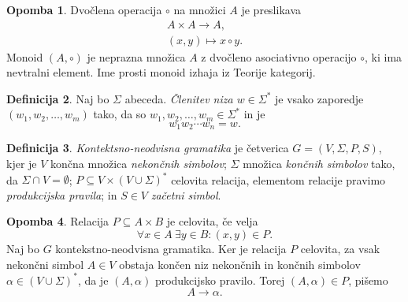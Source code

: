 \documentclass{amsart}
\theoremstyle{definition}
\newtheorem{definicija}{Definicija}[section]
\newtheorem{opomba}[definicija]{Opomba}
\theoremstyle{plain} %
\begin{document}
\begin{opomba}
    
    Dvočlena operacija $ \circ $ na množici $ A $ je preslikava
    \begin{gather*}
        A \times A \rightarrow A, \\
        (x,y) \mapsto x \circ y.
    \end{gather*}
    Monoid $ (A, \circ) $ je neprazna množica $ A $ z dvočleno asociativno operacijo $ \circ $,
    ki ima nevtralni element. Ime prosti monoid izhaja iz Teorije kategorij.

\end{opomba}

\begin{definicija}

    Naj bo $ \Sigma $ abeceda. \textit{Členitev niza $ w \in \Sigma^*$} je vsako zaporedje $ (w_1, w_2, \ldots, w_m ) $ tako,
    da so $ w_1, w_2, \ldots, w_m \in \Sigma^* $ in je
    \[
        w_1w_2 \cdots w_n = w.
    \]

\end{definicija}

\begin{definicija}

    \textit{Kontektsno-neodvisna gramatika} je četverica $ G = ( V, \Sigma, P, S ) $, kjer je
    $ V $ končna množica \textit{nekončnih simbolov}; $ \Sigma $ množica \textit{končnih simbolov}
    tako, da $ \Sigma \cap V = \emptyset $; $ P \subseteq V \times ( V \cup \Sigma )^* $ celovita relacija,
    elementom relacije pravimo \textit{produkcijska pravila}; in $ S \in V $ \textit{začetni simbol}.

\end{definicija}

\begin{opomba}
    
    Relacija $ P \subseteq A \times B $ je celovita, če velja
    \[
        \forall x \in A \ \exists y \in B \colon (x,y) \in P.
    \]
    Naj bo $ G $ kontekstno-neodvisna gramatika. Ker je relacija $ P $ celovita,
    za vsak nekončni simbol $ A \in V $ obstaja končen niz nekončnih in končnih simbolov $ \alpha \in 
    ( V \cup \Sigma )^* $, da je $ (A, \alpha) $ produkcijsko pravilo. Torej $ (A, \alpha) \in P $, pišemo
    \[
        A \rightarrow \alpha.
    \]

\end{opomba}
\end{document}
